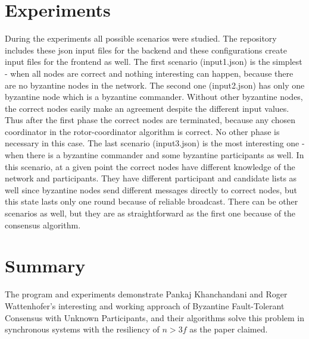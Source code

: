 \documentclass{article}
\begin{document}
\section{Experiments}
During the experiments all possible scenarios were studied. The repository includes these json input files for the backend and these configurations create input files for the frontend as well. The first scenario (input1.json) is the simplest - when all nodes are correct and nothing interesting can happen, because there are no byzantine nodes in the network. The second one (input2.json) has only one byzantine node which is a byzantine commander. Without other byzantine nodes, the correct nodes easily make an agreement despite the different input values. Thus after the first phase the correct nodes are terminated, because any chosen coordinator in the rotor-coordinator algorithm is correct. No other phase is necessary in this case.  The last scenario (input3.json) is the most interesting one - when there is a byzantine commander and some byzantine participants as well. In this scenario, at a given point the correct nodes have different knowledge of the network and participants. They have different participant and candidate lists as well since byzantine nodes send different messages directly to correct nodes, but this state lasts only one round because of reliable broadcast. There can be other scenarios as well, but they are as straightforward as the first one because of the consensus algorithm.

\section{Summary}
The program and experiments demonstrate Pankaj Khanchandani and Roger Wattenhofer’s  interesting and working approach of Byzantine Fault-Tolerant Consensus with Unknown Participants\cite{lamport2019byzantine}, and their algorithms solve this problem in synchronous systems with the resiliency of \(n > 3f\) as the paper claimed.



\end{document}
